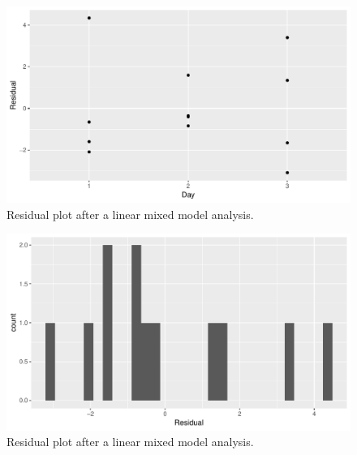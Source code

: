 \documentclass[]{book}\usepackage[]{graphicx}\usepackage[]{color}
\makeatletter
\def\maxwidth{ %
  \ifdim\Gin@nat@width>\linewidth
    \linewidth
  \else
    \Gin@nat@width
  \fi
}
\newenvironment{knitrout}{}{} %
\makeatother
\begin{document}
\begin{enumerate}
\begin{knitrout}
\begin{figure}
{\centering \includegraphics[width=\maxwidth]{figure/nonparmixed_11a-1} 

}

\caption[Residual plot after a linear mixed model analysis]{Residual plot after a linear mixed model analysis.}\label{fig:nonparmixed_11a1}
\end{figure}

\begin{figure}

{\centering \includegraphics[width=\maxwidth]{figure/nonparmixed_11a-2} 

}

\caption[Residual plot after a linear mixed model analysis]{Residual plot after a linear mixed model analysis.}\label{fig:nonparmixed_11a2}
\end{figure}


\end{knitrout}

\begin{knitrout}
\color{fgcolor}\begin{figure}


\end{figure}
\end{knitrout}
\end{enumerate}
\end{document}

